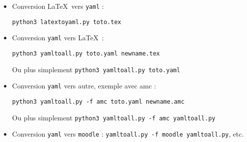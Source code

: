 \documentclass[12pt,a4paper]{article}
\begin{document}
\begin{itemize}
  \item Conversion \LaTeX\ vers \texttt{yaml} : \\
  \centerline{\texttt{python3 latextoyaml.py toto.tex}}
  
   \item Conversion \texttt{yaml} vers \LaTeX\ : \\
   \centerline{\texttt{python3 yamltoall.py toto.yaml newname.tex}} 
   
   Ou plus simplement \texttt{python3 yamltoall.py toto.yaml}
  
   \item Conversion \texttt{yaml} vers autre, exemple avec amc : \\
   \centerline{\texttt{python3 yamltoall.py -f amc toto.yaml newname.amc}} 
   Ou plus simplement \texttt{python3 yamltoall.py -f amc yamltoall.py} 
   
    \item Conversion \texttt{yaml} vers \texttt{moodle} : 
    \texttt{yamltoall.py -f moodle yamltoall.py}, etc. 
    
\end{itemize}
\end{document}
